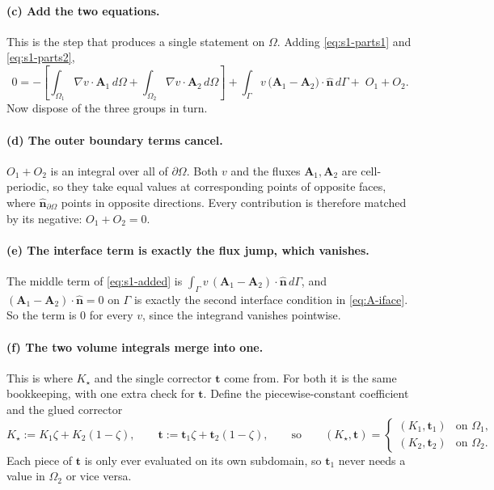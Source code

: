 \documentclass[11pt]{article}
\newcommand{\Om}{\Omega}
\newcommand{\Gam}{\Gamma}
\newcommand{\bn}{\hat{\mathbf n}}
\newcommand{\bt}{\mathbf t}
\newcommand{\ind}{\zeta}  %
\begin{document}
\paragraph{(c) Add the two equations.}
This is the step that produces a single statement on $\Om$. Adding
\eqref{eq:s1-parts1} and \eqref{eq:s1-parts2},
\begin{equation}
0=-\left[\int_{\Om_1}\!\nabla v\cdot\mathbf A_1\,d\Om
        +\int_{\Om_2}\!\nabla v\cdot\mathbf A_2\,d\Om\right]
 +\int_{\Gam} v\,\big(\mathbf A_1-\mathbf A_2\big)\!\cdot\!\bn\,d\Gam
 +\;O_1+O_2 .
\label{eq:s1-added}
\end{equation}
Now dispose of the three groups in turn.

\paragraph{(d) The outer boundary terms cancel.}
$O_1+O_2$ is an integral over all of $\partial\Om$. Both $v$ and the fluxes
$\mathbf A_1,\mathbf A_2$ are cell-periodic, so they take equal values at
corresponding points of opposite faces, where $\bn_{\partial\Om}$ points in
opposite directions. Every contribution is therefore matched by its negative:
$O_1+O_2=0$.

\paragraph{(e) The interface term is exactly the flux jump, which vanishes.}
The middle term of \eqref{eq:s1-added} is
$\int_\Gam v\,(\mathbf A_1-\mathbf A_2)\!\cdot\!\bn\,d\Gam$, and
$(\mathbf A_1-\mathbf A_2)\!\cdot\!\bn=0$ on $\Gam$ is exactly the second
interface condition in \eqref{eq:A-iface}. So the term is $0$ for every $v$,
since the integrand vanishes pointwise.

\paragraph{(f) The two volume integrals merge into one.}
This is where $K_\star$ and the single corrector $\bt$ come from. For both it is
the same bookkeeping, with one extra check for $\bt$. Define the
piecewise-constant coefficient and the glued corrector
\begin{equation}
K_\star:=K_1\ind+K_2(1-\ind),
\qquad
\bt:=\bt_1\ind+\bt_2(1-\ind),
\qquad\text{so}\qquad
(K_\star,\bt)=
\begin{cases}(K_1,\bt_1) & \text{on }\Om_1,\\ (K_2,\bt_2) & \text{on }\Om_2 .\end{cases}
\label{eq:Kstar}
\end{equation}
Each piece of $\bt$ is only ever evaluated on its own subdomain, so $\bt_1$
never needs a value in $\Om_2$ or vice versa.
\end{document}
